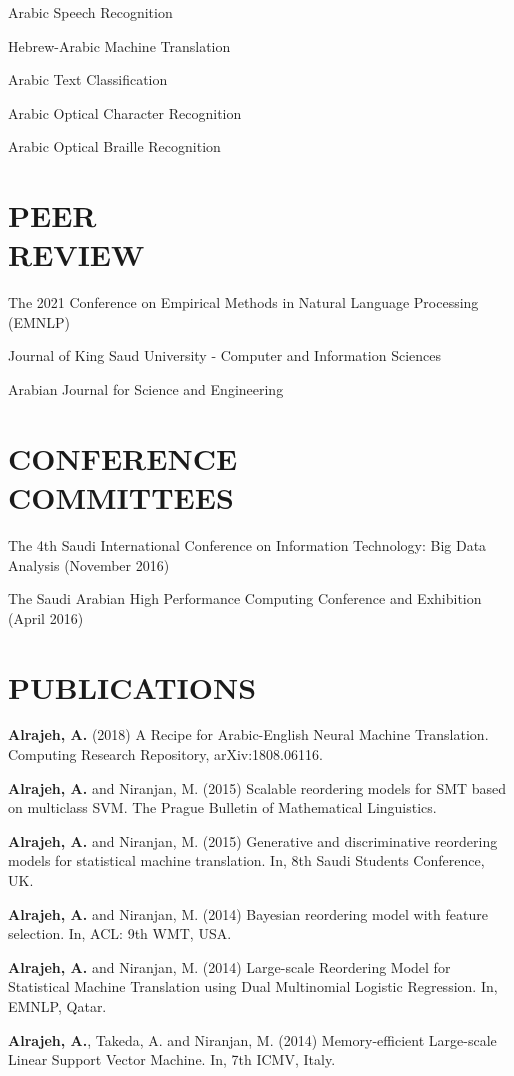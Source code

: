 \documentclass[margin,a4paper]{res}
\begin{document}
\begin{resume}
Arabic Speech Recognition

Hebrew-Arabic Machine Translation

Arabic Text Classification

Arabic Optical Character Recognition

Arabic Optical Braille Recognition

\section{PEER\\REVIEW}
The 2021 Conference on Empirical Methods in Natural Language Processing (EMNLP)

Journal of King Saud University - Computer and Information Sciences

Arabian Journal for Science and Engineering

\section{CONFERENCE\\COMMITTEES} 

The 4th Saudi International Conference on Information Technology: Big Data Analysis (November 2016)

The Saudi Arabian High Performance Computing Conference and Exhibition (April 2016)


\section{PUBLICATIONS}
{\bf Alrajeh, A.} (2018) A Recipe for Arabic-English Neural Machine Translation. Computing Research Repository, arXiv:1808.06116.

{\bf Alrajeh, A.} and Niranjan, M. (2015) Scalable reordering models for SMT based on multiclass SVM. The Prague Bulletin of Mathematical Linguistics.

{\bf Alrajeh, A.} and Niranjan, M. (2015) Generative and discriminative reordering models for statistical machine translation. In, 8th Saudi Students Conference, UK.

{\bf Alrajeh, A.} and Niranjan, M. (2014) Bayesian reordering model with feature selection. In, ACL: 9th WMT, USA.

{\bf Alrajeh, A.} and Niranjan, M. (2014) Large-scale Reordering Model for Statistical Machine Translation using Dual Multinomial Logistic Regression. In, EMNLP, Qatar.

{\bf Alrajeh, A.}, Takeda, A. and Niranjan, M. (2014) Memory-efficient Large-scale Linear Support Vector Machine. In, 7th ICMV, Italy.


\end{resume}
\end{document}
